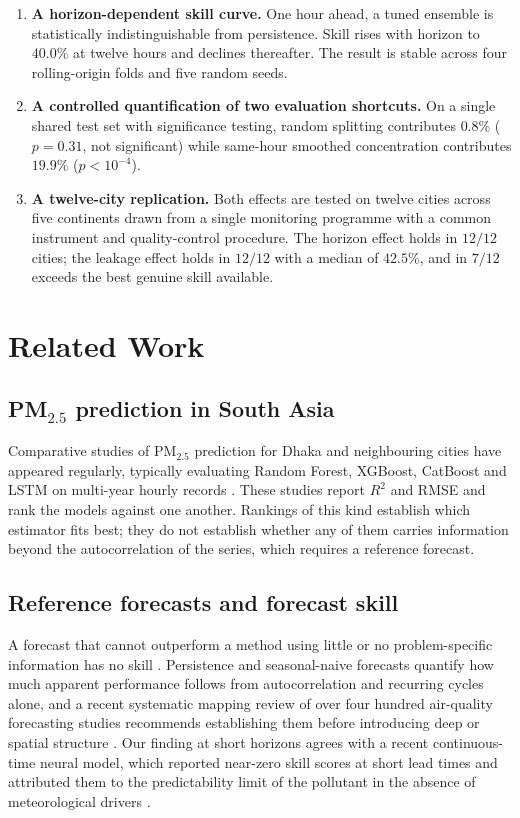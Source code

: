 \documentclass[conference,a4paper]{IEEEtran}
\begin{document}
\begin{enumerate}
\item \textbf{A horizon-dependent skill curve.} One hour ahead, a tuned ensemble
      is statistically indistinguishable from persistence. Skill rises with
      horizon to $40.0\%$ at twelve hours and declines thereafter. The result is
      stable across four rolling-origin folds and five random seeds.
\item \textbf{A controlled quantification of two evaluation shortcuts.} On a
      single shared test set with significance testing, random splitting
      contributes $0.8\%$ ($p=0.31$, not significant) while same-hour smoothed
      concentration contributes $19.9\%$ ($p<10^{-4}$).
\item \textbf{A twelve-city replication.} Both effects are tested on twelve
      cities across five continents drawn from a single monitoring programme
      with a common instrument and quality-control procedure. The horizon effect
      holds in $12/12$ cities; the leakage effect holds in $12/12$ with a median
      of $42.5\%$, and in $7/12$ exceeds the best genuine skill available.
\end{enumerate}

\section{Related Work}

\subsection{PM$_{2.5}$ prediction in South Asia}
Comparative studies of PM$_{2.5}$ prediction for Dhaka and neighbouring cities
have appeared regularly, typically evaluating Random Forest, XGBoost, CatBoost
and LSTM on multi-year hourly records \cite{dhaka_compare,dhaka_health}. These
studies report $R^2$ and RMSE and rank the models against one another. Rankings
of this kind establish which estimator fits best; they do not establish whether
any of them carries information beyond the autocorrelation of the series, which
requires a reference forecast.

\subsection{Reference forecasts and forecast skill}
A forecast that cannot outperform a method using little or no problem-specific
information has no skill \cite{forecast_review}. Persistence and seasonal-naive
forecasts quantify how much apparent performance follows from autocorrelation and
recurring cycles alone, and a recent systematic mapping review of over four
hundred air-quality forecasting studies recommends establishing them before
introducing deep or spatial structure \cite{forecast_review}. Our finding at
short horizons agrees with a recent continuous-time neural model, which reported
near-zero skill scores at short lead times and attributed them to the
predictability limit of the pollutant in the absence of meteorological drivers
\cite{manode}.
\end{document}
